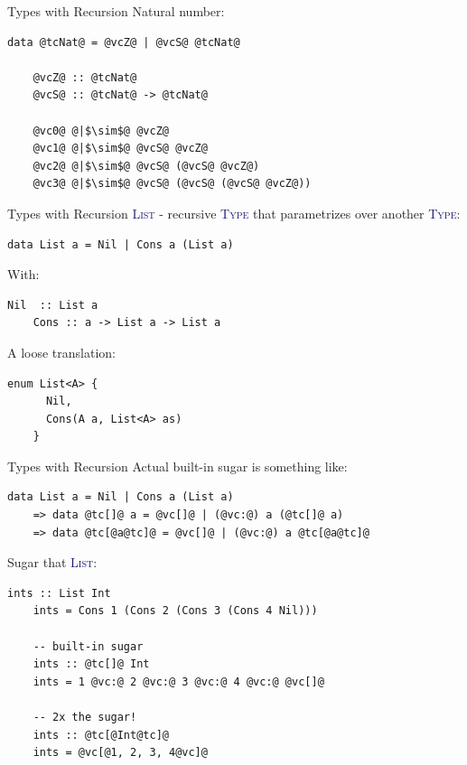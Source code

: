 \documentclass[xcolor={usenames,dvipsnames}]{beamer}
\newcommand{\htycon}[1]{\textcolor{MidnightBlue}{\textsc{#1}}}
\begin{document}
\begin{frame}[fragile]{Types with Recursion}
  Natural number:
  \begin{lstlisting}[style=hask]
    data @tcNat@ = @vcZ@ | @vcS@ @tcNat@

    @vcZ@ :: @tcNat@
    @vcS@ :: @tcNat@ -> @tcNat@

    @vc0@ @|$\sim$@ @vcZ@
    @vc1@ @|$\sim$@ @vcS@ @vcZ@
    @vc2@ @|$\sim$@ @vcS@ (@vcS@ @vcZ@)
    @vc3@ @|$\sim$@ @vcS@ (@vcS@ (@vcS@ @vcZ@))
  \end{lstlisting}
\end{frame}

\begin{frame}[fragile]{Types with Recursion}
  \htycon{List} - recursive \htycon{Type} that parametrizes over another \htycon{Type}:
  \begin{lstlisting}[style=hask]
    data List a = Nil | Cons a (List a)
  \end{lstlisting}

  With:
  \begin{lstlisting}[style=hask]
    Nil  :: List a
    Cons :: a -> List a -> List a
  \end{lstlisting}

  A loose translation:
  \begin{lstlisting}[style=hask]
    enum List<A> {
      Nil,
      Cons(A a, List<A> as)
    }
  \end{lstlisting}
\end{frame}

\begin{frame}[fragile]{Types with Recursion}
  Actual built-in sugar is something like:
  \begin{lstlisting}[style=hask]
       data List a = Nil | Cons a (List a)
    => data @tc[]@ a = @vc[]@ | (@vc:@) a (@tc[]@ a)
    => data @tc[@a@tc]@ = @vc[]@ | (@vc:@) a @tc[@a@tc]@
  \end{lstlisting}

  Sugar that \htycon{List}:
  \begin{lstlisting}[style=hask]
    ints :: List Int 
    ints = Cons 1 (Cons 2 (Cons 3 (Cons 4 Nil)))

    -- built-in sugar
    ints :: @tc[]@ Int
    ints = 1 @vc:@ 2 @vc:@ 3 @vc:@ 4 @vc:@ @vc[]@

    -- 2x the sugar!
    ints :: @tc[@Int@tc]@
    ints = @vc[@1, 2, 3, 4@vc]@
  \end{lstlisting}
\end{frame}
\end{document}
